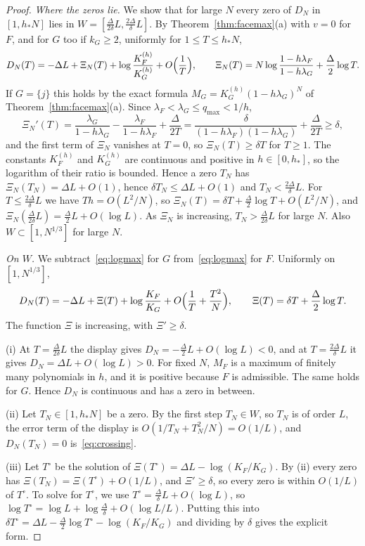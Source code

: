 \begin{proof}
\emph{Where the zeros lie.} We show that for large $N$ every zero of $D_N$ in
$[1,h_*N]$ lies in $W=[\frac\Delta{2\delta}L,\frac{2\Delta}\delta L]$. By
Theorem~\ref{thm:facemax}(a) with $v=0$ for $F$, and for $G$ too if $k_G\ge2$,
uniformly for $1\le T\le h_*N$,
\[
D_N(T)=-\Delta L+\Xi_N(T)+\log\frac{K^{(h)}_F}{K^{(h)}_G}+O\Bigl(\frac1T\Bigr),
\qquad\Xi_N(T)=N\log\frac{1-h\lambda_F}{1-h\lambda_G}+\frac\Delta2\log T .
\]
If $G=\{j\}$ this holds by the exact formula $M_G=K^{(h)}_G(1-h\lambda_G)^N$ of
Theorem~\ref{thm:facemax}(a). Since $\lambda_F<\lambda_G\le q_{\max}<1/h$,
\[
\Xi_N'(T)=\frac{\lambda_G}{1-h\lambda_G}-\frac{\lambda_F}{1-h\lambda_F}+\frac\Delta{2T}
=\frac\delta{(1-h\lambda_F)(1-h\lambda_G)}+\frac\Delta{2T}\ge\delta,
\]
and the first term of $\Xi_N$ vanishes at $T=0$, so $\Xi_N(T)\ge\delta T$ for $T\ge1$.
The constants $K^{(h)}_F$ and $K^{(h)}_G$ are continuous and positive in
$h\in[0,h_*]$, so the logarithm of their ratio is bounded. Hence a zero $T_N$ has
$\Xi_N(T_N)=\Delta L+O(1)$, hence $\delta T_N\le\Delta L+O(1)$ and
$T_N<\frac{2\Delta}\delta L$. For $T\le\frac{2\Delta}\delta L$ we have $Th=O(L^2/N)$,
so $\Xi_N(T)=\delta T+\frac\Delta2\log T+O(L^2/N)$, and
$\Xi_N(\frac\Delta{2\delta}L)=\frac\Delta2L+O(\log L)$. As $\Xi_N$ is increasing,
$T_N>\frac\Delta{2\delta}L$ for large $N$. Also $W\subset[1,N^{1/3}]$ for large $N$.

\emph{On $W$.} We subtract~\eqref{eq:logmax} for $G$ from~\eqref{eq:logmax} for $F$.
Uniformly on $[1,N^{1/3}]$,
\[
D_N(T)=-\Delta L+\Xi(T)+\log\frac{K_F}{K_G}+O\Bigl(\frac1T+\frac{T^2}N\Bigr),
\qquad\Xi(T)=\delta T+\frac\Delta2\log T .
\]
The function $\Xi$ is increasing, with $\Xi'\ge\delta$.

(i) At $T=\frac{\Delta}{2\delta}L$ the display gives $D_N=-\frac\Delta2L+O(\log L)<0$, and at
$T=\frac{2\Delta}\delta L$ it gives $D_N=\Delta L+O(\log L)>0$. For fixed $N$, $M_F$ is a maximum
of finitely many polynomials in $h$, and it is positive because $F$ is admissible. The same holds
for $G$. Hence $D_N$ is continuous and has a zero in between.

(ii) Let $T_N\in[1,h_*N]$ be a zero. By the first step $T_N\in W$, so $T_N$ is of
order $L$, the error term of the display is $O(1/T_N+T_N^2/N)=O(1/L)$, and
$D_N(T_N)=0$ is~\eqref{eq:crossing}.

(iii) Let $T^\circ$ be the solution of $\Xi(T^\circ)=\Delta L-\log(K_F/K_G)$. By (ii) every zero
has $\Xi(T_N)=\Xi(T^\circ)+O(1/L)$, and $\Xi'\ge\delta$, so every zero is within $O(1/L)$ of
$T^\circ$. To solve for $T^\circ$, we use $T^\circ=\frac\Delta\delta L+O(\log L)$, so
$\log T^\circ=\log L+\log\frac\Delta\delta+O(\log L/L)$. Putting this into
$\delta T^\circ=\Delta L-\frac\Delta2\log T^\circ-\log(K_F/K_G)$ and dividing by $\delta$ gives
the explicit form.


\end{proof}
